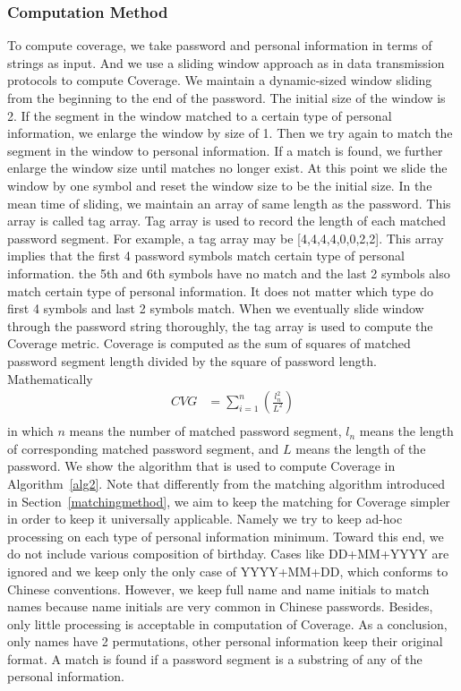 \subsubsection{Computation Method}
\label{computationmethod}
To compute coverage, we take password and personal information in terms of strings as input. And we use a sliding window approach as in data transmission protocols to compute Coverage. We maintain a dynamic-sized window sliding from the beginning to the end of the password. The initial size of the window is 2. If the segment in the window matched to a certain type of personal information, we enlarge the window by size of 1. Then we try again to match the segment in the window to personal information. If a match is found, we further enlarge the window size until matches no longer exist. At this point we slide the window by one symbol and reset the window size to be the initial size. In the mean time of sliding, we maintain an array of same length as the password. This array is called tag array. Tag array is used to record the length of each matched password segment. For example, a tag array may be [4,4,4,4,0,0,2,2]. This array implies that the first 4 password symbols match certain type of personal information. the 5th and 6th symbols have no match and the last 2 symbols also match certain type of personal information. It does not matter which type do first 4 symbols and last 2 symbols match. When we eventually slide window through the password string thoroughly, the tag array is used to compute the Coverage metric. Coverage is computed as the sum of squares of matched password segment length divided by the square of password length. Mathematically
\begin{equation} \label{eq1}
\begin{split}
CVG & = \sum_{i=1}^n (\frac{l_n^2}{L^2}) \\
\end{split}
\end{equation}
in which $n$ means the number of matched password segment, $l_n$ means the length of corresponding matched password segment, and $L$ means the length of the password. We show the algorithm that is used to compute Coverage in Algorithm~\ref{alg2}. Note that differently from the matching algorithm introduced in Section~\ref{matchingmethod}, we aim to keep the matching for Coverage simpler in order to keep it universally applicable. Namely we try to keep ad-hoc processing on each type of personal information minimum. Toward this end, we do not include various composition of birthday. Cases like DD+MM+YYYY are ignored and we keep only the only case of YYYY+MM+DD, which conforms to Chinese conventions. However, we keep full name and name initials to match names because name initials are very common in Chinese passwords. Besides, only little processing is acceptable in computation of Coverage. As a conclusion, only names have 2 permutations, other personal information keep their original format. A match is found if a password segment is a substring of any of the personal information.


